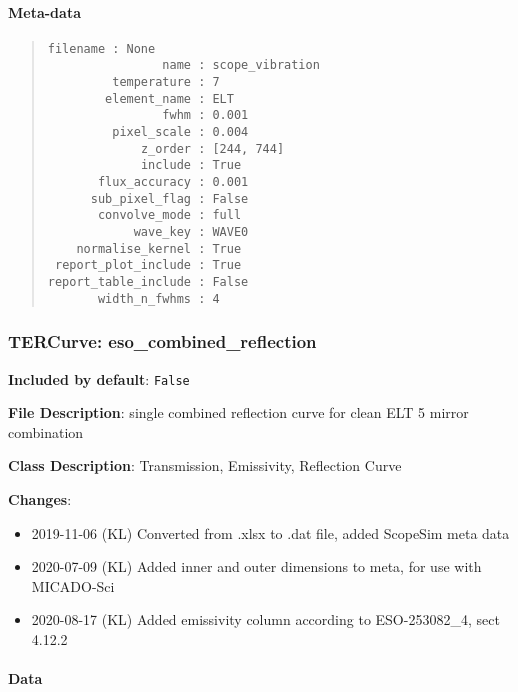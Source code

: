 \paragraph{Meta-data%
  \label{id2}%
}

\begin{quote}
\begin{alltt}
\begin{lstlisting}[frame=single]
            filename : None
                name : scope_vibration
         temperature : 7
        element_name : ELT
                fwhm : 0.001
         pixel_scale : 0.004
             z_order : [244, 744]
             include : True
       flux_accuracy : 0.001
      sub_pixel_flag : False
       convolve_mode : full
            wave_key : WAVE0
    normalise_kernel : True
 report_plot_include : True
report_table_include : False
       width_n_fwhms : 4
\end{lstlisting}
\end{alltt}
\end{quote}


\subsubsection{TERCurve: \textquotedbl{}eso\_combined\_reflection\textquotedbl{}%
  \label{tercurve-eso-combined-reflection}%
}

\textbf{Included by default}: \texttt{False}

\textbf{File Description}: single combined reflection curve for clean ELT 5 mirror combination

\textbf{Class Description}: Transmission, Emissivity, Reflection Curve

\textbf{Changes}:

\begin{itemize}
\item 2019-11-06 (KL) Converted from .xlsx to .dat file, added ScopeSim meta data

\item 2020-07-09 (KL) Added inner and outer dimensions to meta, for use with MICADO-Sci

\item 2020-08-17 (KL) Added emissivity column according to ESO-253082\_4, sect 4.12.2
\end{itemize}


\paragraph{Data%
  \label{id3}%
}


